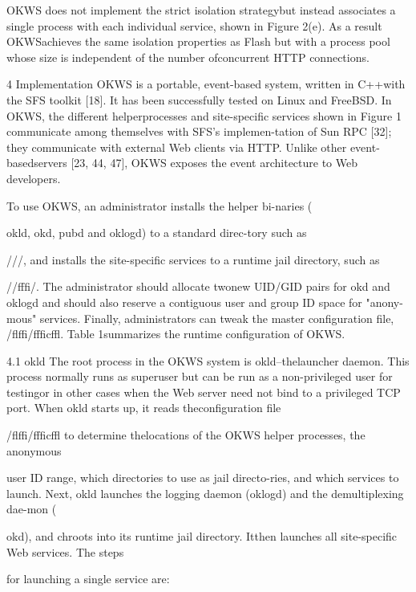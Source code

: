 OKWS does not implement the strict isolation strategybut instead associates a single process with each individual service, shown in Figure 2(e). As a result OKWSachieves the same isolation properties as Flash but with a
process pool whose size is independent of the number ofconcurrent HTTP connections.

4 Implementation
OKWS is a portable, event-based system, written in C++with the SFS toolkit [18]. It has been successfully tested
on Linux and FreeBSD. In OKWS, the different helperprocesses and site-specific services shown in Figure 1
communicate among themselves with SFS's implemen-tation of Sun RPC [32]; they communicate with external Web clients via HTTP. Unlike other event-basedservers [23, 44, 47], OKWS exposes the event architecture to Web developers.

To use OKWS, an administrator installs the helper bi-naries (

okld, okd, pubd and oklogd) to a standard direc-tory such as

/\Gamma \Delta \Theta /\Lambda \Xi \Pi \Sigma \Lambda /\Delta \Upsilon \Phi \Psi , and installs the site-specific services to a runtime jail directory, such as

/\Omega \Sigma \Theta /\Xi fffi\Delta /\Theta \Gamma \Psi . The administrator should allocate twonew UID/GID pairs for okd and oklogd and should also
reserve a contiguous user and group ID space for "anony-mous" services. Finally, administrators can tweak the
master configuration file, /flffi\Pi /\Xi fffi\Delta  \Pi \Xi \Psi c\Phi ffl. Table 1summarizes the runtime configuration of OKWS.

4.1 okld
The root process in the OKWS system is okld--thelauncher daemon. This process normally runs as superuser but can be run as a non-privileged user for testingor in other cases when the Web server need not bind to
a privileged TCP port. When okld starts up, it reads theconfiguration file

/flffi\Pi /\Xi fffi\Delta  \Pi \Xi \Psi c\Phi ffl to determine thelocations of the OKWS helper processes, the anonymous

user ID range, which directories to use as jail directo-ries, and which services to launch. Next, okld launches
the logging daemon (oklogd) and the demultiplexing dae-mon (

okd), and chroots into its runtime jail directory. Itthen launches all site-specific Web services. The steps

for launching a single service are:

